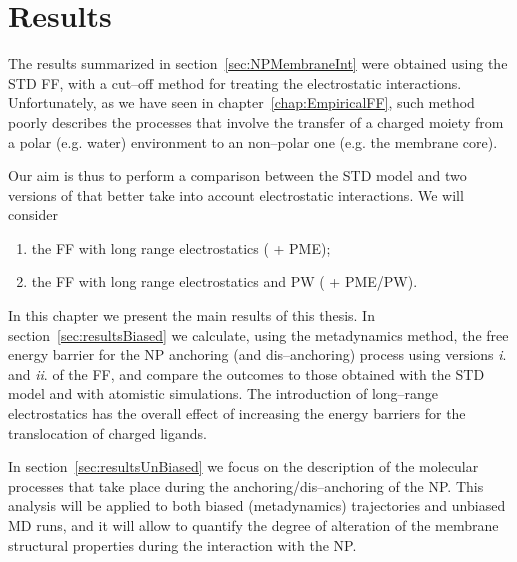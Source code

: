 \chapter{Results}
\label{chap:results}
The results summarized in section~\ref{sec:NPMembraneInt} were obtained using the \ac{STD} \martini{} \ac{FF}, 
with a cut--off method for treating the electrostatic interactions. Unfortunately, as we have seen in 
chapter~\ref{chap:EmpiricalFF}, such method poorly describes the processes that involve the transfer of a charged 
moiety from a polar (e.g. water) environment to an non--polar one (e.g. the membrane core).

Our aim is thus to perform a comparison between the \ac{STD} \martini{} model and two versions of \martini{} that 
better take into account electrostatic interactions. We will consider
\begin{enumerate}[label=\itshape\roman*.]
	\item the \martini{} \ac{FF} with long range electrostatics (\martini{} + \ac{PME});
	\item the \martini{} \ac{FF} with long range electrostatics and \ac{PW} (\martini{} + \ac{PME}/\acs{PW}).
\end{enumerate}

In this chapter we present the main results of this thesis. In section~\ref{sec:resultsBiased} we calculate, using 
the metadynamics method, the free energy barrier for the \ac{NP} anchoring (and dis--anchoring) process using 
versions \textit{i}. and \textit{ii}. of the \martini{} \ac{FF}, and compare the outcomes to those obtained with 
the \ac{STD} \martini{} model and with atomistic simulations. The introduction of long--range electrostatics has 
the overall effect of increasing the energy barriers for the translocation of charged ligands.

In section~\ref{sec:resultsUnBiased} we focus on the description of the molecular processes that take place during the anchoring/dis--anchoring of the \ac{NP}. This analysis will be applied to both biased (metadynamics) trajectories and unbiased \ac{MD} runs, and it will allow to quantify the degree of alteration of the membrane structural properties during the interaction with the \ac{NP}.

